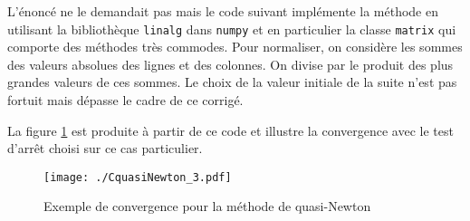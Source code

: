 L'énoncé ne le demandait pas mais le code suivant implémente la méthode en utilisant la bibliothèque \texttt{linalg} dans \texttt{numpy} et en particulier la classe \texttt{matrix} qui comporte des méthodes très commodes.\newline
Pour normaliser, on considère les sommes des valeurs absolues des lignes et des colonnes. On divise par le produit des plus grandes valeurs de ces sommes. Le choix de la valeur initiale de la suite n'est pas fortuit mais dépasse le cadre de ce corrigé.

La figure \ref{fig:CquasiNewton_3} est produite à partir de ce code et illustre la convergence avec le test d'arrêt choisi sur ce cas particulier.
\begin{figure}[h]
  \centering
  \texttt{[image: ./CquasiNewton\_3.pdf]}
  \caption{Exemple de convergence pour la méthode de quasi-Newton}
  \label{fig:CquasiNewton_3}
\end{figure}
